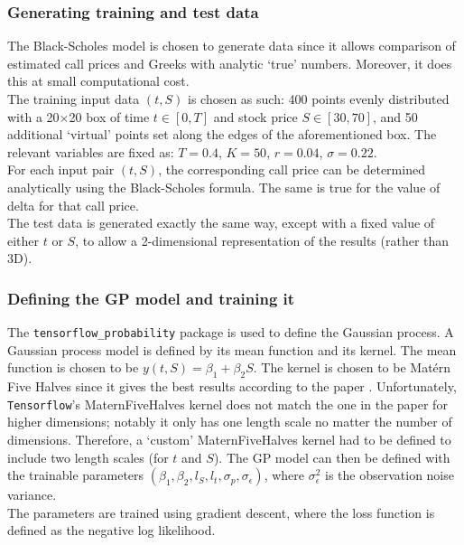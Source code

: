 \documentclass[a4paper,12pt]{article}
\begin{document}
\subsubsection{Generating training and test data \label{sec:generating_data}}
The Black-Scholes model is chosen to generate data since it allows comparison of estimated call prices and Greeks with analytic `true' numbers. Moreover, it does this at small computational cost.\\
The training input data $(t,S)$ is chosen as such: 400 points evenly distributed with a 20$\times$20 box of time $t \in [0, T]$ and stock price $S \in [30, 70]$, and 50 additional `virtual' points set along the edges of the aforementioned box. The relevant variables are fixed as: $T = 0.4$, $K = 50$, $r = 0.04$, $\sigma = 0.22$.\\
For each input pair $(t, S)$, the corresponding call price can be determined analytically using the Black-Scholes formula. The same is true for the value of delta for that call price.\\
The test data is generated exactly the same way, except with a fixed value of either $t$ or $S$, to allow a 2-dimensional representation of the results (rather than 3D).

\subsubsection{Defining the GP model and training it}
The \texttt{tensorflow\_probability} package is used to define the Gaussian process. A Gaussian process model is defined by its mean function and its kernel. The mean function is chosen to be $y(t,S) = \beta_1 + \beta_2 S$. The kernel is chosen to be Matérn Five Halves since it gives the best results according to the paper \cite{Ludkovski2020}. Unfortunately, \texttt{Tensorflow}'s MaternFiveHalves kernel does not match the one in the paper for higher dimensions; notably it only has one length scale no matter the number of dimensions. Therefore, a `custom' MaternFiveHalves kernel had to be defined to include two length scales (for $t$ and $S$). The GP model can then be defined with the trainable parameters $(\beta_1, \beta_2, l_S, l_t, \sigma_p, \sigma_\epsilon)$, where $\sigma_\epsilon^2$ is the observation noise variance.\\
The parameters are trained using gradient descent, where the loss function is defined as the negative log likelihood.
\end{document}
